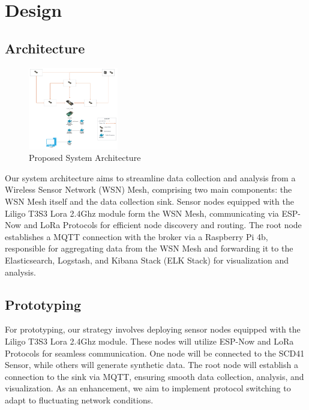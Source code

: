 \section*{Design}\label{design}


\subsection{Architecture}\label{architecture}

\begin{figure}[h]
  \begin{center}
    \includegraphics[width=0.35\textwidth]{./Figures/architecture.png}
  \end{center}
  \caption{Proposed System Architecture}\label{architecture}
\end{figure}

Our system architecture aims to streamline data collection and analysis from a Wireless Sensor Network (WSN) Mesh, comprising two main components: the WSN Mesh itself and the data collection sink. Sensor nodes equipped with the Liligo T3S3 Lora 2.4Ghz module form the WSN Mesh, communicating via ESP-Now and LoRa Protocols for efficient node discovery and routing. The root node establishes a MQTT connection with the broker via a Raspberry Pi 4b, responsible for aggregating data from the WSN Mesh and forwarding it to the Elasticsearch, Logstash, and Kibana Stack (ELK Stack) for visualization and analysis.

\subsection{Prototyping}\label{prototyping}
For prototyping, our strategy involves deploying sensor nodes equipped with the Liligo T3S3 Lora 2.4Ghz module. These nodes will utilize ESP-Now and LoRa Protocols for seamless communication. One node will be connected to the SCD41 Sensor, while others will generate synthetic data. The root node will establish a connection to the sink via MQTT, ensuring smooth data collection, analysis, and visualization. As an enhancement, we aim to implement protocol switching to adapt to fluctuating network conditions.

